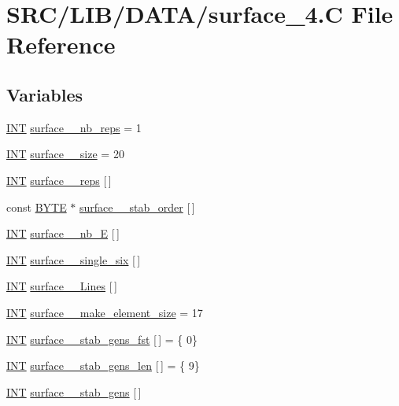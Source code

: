 \hypertarget{surface__4_8_c}{}\section{S\+R\+C/\+L\+I\+B/\+D\+A\+T\+A/surface\+\_\+4.C File Reference}
\label{surface__4_8_c}
\subsection*{Variables}
\begin{DoxyCompactItemize}
\item 
\mbox{\hyperlink{galois_8h_a09fddde158a3a20bd2dcadb609de11dc}{I\+NT}} \mbox{\hyperlink{surface__4_8_c_a27d650ee7d188b0503404ded4aa68d6f}{surface\+\_\+\_\+nb\+\_\+reps}} = 1
\item 
\mbox{\hyperlink{galois_8h_a09fddde158a3a20bd2dcadb609de11dc}{I\+NT}} \mbox{\hyperlink{surface__4_8_c_aacca0e2c0a5c15bbc2535875afdabada}{surface\+\_\+\_\+size}} = 20
\item 
\mbox{\hyperlink{galois_8h_a09fddde158a3a20bd2dcadb609de11dc}{I\+NT}} \mbox{\hyperlink{surface__4_8_c_a95f6db737b4ed060787db0b749c7147b}{surface\+\_\+\_\+reps}} \mbox{[}$\,$\mbox{]}
\item 
const \mbox{\hyperlink{galois_8h_ab6cc7b4aeb6ea31aba2b3fbfc83ff5e6}{B\+Y\+TE}} $\ast$ \mbox{\hyperlink{surface__4_8_c_a72a459bc73d39e7aa555ed750173c0bb}{surface\+\_\+\_\+stab\+\_\+order}} \mbox{[}$\,$\mbox{]}
\item 
\mbox{\hyperlink{galois_8h_a09fddde158a3a20bd2dcadb609de11dc}{I\+NT}} \mbox{\hyperlink{surface__4_8_c_af783283207ea9550d6e099de1c2b645f}{surface\+\_\+\_\+nb\+\_\+E}} \mbox{[}$\,$\mbox{]}
\item 
\mbox{\hyperlink{galois_8h_a09fddde158a3a20bd2dcadb609de11dc}{I\+NT}} \mbox{\hyperlink{surface__4_8_c_af5b1ae10a3c94dd3c10ca3da5c334fb3}{surface\+\_\+\_\+single\+\_\+six}} \mbox{[}$\,$\mbox{]}
\item 
\mbox{\hyperlink{galois_8h_a09fddde158a3a20bd2dcadb609de11dc}{I\+NT}} \mbox{\hyperlink{surface__4_8_c_aa08f0f965061aaf14f5f91a407964acb}{surface\+\_\+\_\+\+Lines}} \mbox{[}$\,$\mbox{]}
\item 
\mbox{\hyperlink{galois_8h_a09fddde158a3a20bd2dcadb609de11dc}{I\+NT}} \mbox{\hyperlink{surface__4_8_c_ae81c51a9db91a8b060a7cb91a69343e5}{surface\+\_\+\_\+make\+\_\+element\+\_\+size}} = 17
\item 
\mbox{\hyperlink{galois_8h_a09fddde158a3a20bd2dcadb609de11dc}{I\+NT}} \mbox{\hyperlink{surface__4_8_c_adbaefb29812d9d7cc566efe81166caf5}{surface\+\_\+\_\+stab\+\_\+gens\+\_\+fst}} \mbox{[}$\,$\mbox{]} = \{ 0\}
\item 
\mbox{\hyperlink{galois_8h_a09fddde158a3a20bd2dcadb609de11dc}{I\+NT}} \mbox{\hyperlink{surface__4_8_c_aa6fb868a02ede01e35d202f94d28a0aa}{surface\+\_\+\_\+stab\+\_\+gens\+\_\+len}} \mbox{[}$\,$\mbox{]} = \{ 9\}
\item 
\mbox{\hyperlink{galois_8h_a09fddde158a3a20bd2dcadb609de11dc}{I\+NT}} \mbox{\hyperlink{surface__4_8_c_aaa4cd007c0bfbbe5e2cd525eeddfd7a7}{surface\+\_\+\_\+stab\+\_\+gens}} \mbox{[}$\,$\mbox{]}
\end{DoxyCompactItemize}


